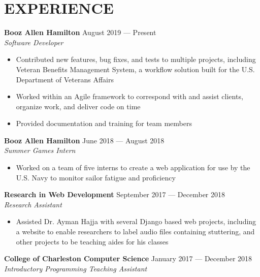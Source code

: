 \documentclass[letterpaper,14pt]{extarticle}
\begin{document}
\section*{EXPERIENCE}
\textbf{Booz Allen Hamilton}
  \hspace*{\fill}
  \textcolor{color2}{August 2019 --- Present}
  \\ 
  \textcolor{color2}{
    \textit{
      \qquad{}Software Developer
    }
  }

  \begin{itemize}[itemsep=0pt, topsep=2pt]
    \item{Contributed new features, bug fixes, and tests to multiple projects, including Veteran Benefits Management System, a workflow solution built for the U.S. Department of Veterans Affairs}
    \item{Worked within an Agile framework to correspond with and assist clients, organize work, and deliver code on time}
    \item{Provided documentation and training for team members}
  \end{itemize}


\textbf{Booz Allen Hamilton}
  \hspace*{\fill}
  \textcolor{color2}{June 2018 --- August 2018}
  \\ 
  \textcolor{color2}{
    \textit{
      \qquad{} Summer Games Intern
    }
  }

  \begin{itemize}[itemsep=0pt, topsep=2pt]
    \item{Worked on a team of five interns to create a web application for use by the U.S. Navy to monitor sailor fatigue and proficiency} \end{itemize}

  \textbf{Research in Web Development}
  \hspace*{\fill}
  \textcolor{color2}{September 2017 --- December 2018}
  \\ 
  \textcolor{color2}{
    \textit{
      \qquad{} Research Assistant
    }
  }

  \begin{itemize}[itemsep=0pt, topsep=2pt]
    \item{Assisted Dr. Ayman Hajja with several Django based web projects, including a website to enable researchers to label audio files containing stuttering, and other projects to be teaching aides for his classes}
  \end{itemize}


  \textbf{College of Charleston Computer Science}
  \hspace*{\fill}
  \textcolor{color2}{January 2017 --- December 2018}
  \\ 
  \textcolor{color2}{
    \textit{
      \qquad{} Introductory Programming Teaching Assistant
    }
  }
\end{document}
